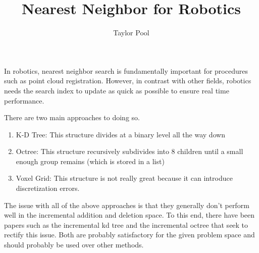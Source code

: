 \documentclass{article}
\title{Nearest Neighbor for Robotics}
\author{Taylor Pool}
\begin{document}
\maketitle

In robotics, nearest neighbor search is fundamentally important for procedures such as point cloud registration.
However, in contrast with other fields, robotics needs the search index to update as quick as possible to ensure real time performance.

There are two main approaches to doing so.

\begin{enumerate}
\item K-D Tree: This structure divides at a binary level all the way down
\item Octree: This structure recursively subdivides into 8 children until a small enough group remains (which is stored in a list)
\item Voxel Grid: This structure is not really great because it can introduce discretization errors.
\end{enumerate}

The issue with all of the above approaches is that they generally don't perform well in the incremental addition and deletion space.
To this end, there have been papers such as the incremental kd tree \cite{cai_ikd-tree_2021} and the incremental octree \cite{zhu_i-octree_2024} that seek to rectify this issue.
Both are probably satisfactory for the given problem space and should probably be used over other methods.

\printbibliography
\end{document}
